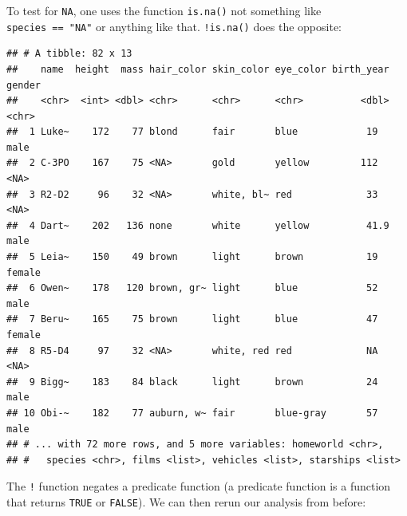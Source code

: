 \documentclass[]{gitbook}
\newenvironment{Shaded}{\begin{snugshade}}{\end{snugshade}}
\newcommand{\DataTypeTok}[1]{\textcolor[rgb]{0.13,0.29,0.53}{#1}}
\newcommand{\DecValTok}[1]{\textcolor[rgb]{0.00,0.00,0.81}{#1}}
\newcommand{\KeywordTok}[1]{\textcolor[rgb]{0.13,0.29,0.53}{\textbf{#1}}}
\newcommand{\NormalTok}[1]{#1}
\newcommand{\OperatorTok}[1]{\textcolor[rgb]{0.81,0.36,0.00}{\textbf{#1}}}
\newcommand{\OtherTok}[1]{\textcolor[rgb]{0.56,0.35,0.01}{#1}}
\newcommand{\StringTok}[1]{\textcolor[rgb]{0.31,0.60,0.02}{#1}}
\theoremstyle{definition}
\theoremstyle{definition}
\theoremstyle{definition}
\theoremstyle{remark}
\begin{document}
To test for \texttt{NA}, one uses the function \texttt{is.na()} not
something like \texttt{species\ ==\ "NA"} or anything like that.
\texttt{!is.na()} does the opposite:

\begin{Shaded}
\end{Shaded}

\begin{verbatim}
## # A tibble: 82 x 13
##    name  height  mass hair_color skin_color eye_color birth_year gender
##    <chr>  <int> <dbl> <chr>      <chr>      <chr>          <dbl> <chr> 
##  1 Luke~    172    77 blond      fair       blue            19   male  
##  2 C-3PO    167    75 <NA>       gold       yellow         112   <NA>  
##  3 R2-D2     96    32 <NA>       white, bl~ red             33   <NA>  
##  4 Dart~    202   136 none       white      yellow          41.9 male  
##  5 Leia~    150    49 brown      light      brown           19   female
##  6 Owen~    178   120 brown, gr~ light      blue            52   male  
##  7 Beru~    165    75 brown      light      blue            47   female
##  8 R5-D4     97    32 <NA>       white, red red             NA   <NA>  
##  9 Bigg~    183    84 black      light      brown           24   male  
## 10 Obi-~    182    77 auburn, w~ fair       blue-gray       57   male  
## # ... with 72 more rows, and 5 more variables: homeworld <chr>,
## #   species <chr>, films <list>, vehicles <list>, starships <list>
\end{verbatim}

The \texttt{!} function negates a predicate function (a predicate
function is a function that returns \texttt{TRUE} or \texttt{FALSE}). We
can then rerun our analysis from before:

\begin{Shaded}
\end{Shaded}
\end{document}
